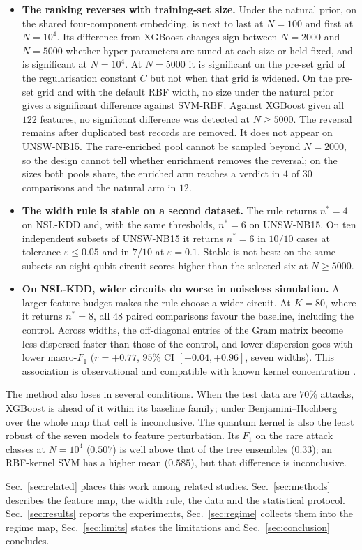 \begin{itemize}
  \item \textbf{The ranking reverses with training-set size.} Under the natural prior, on the
    shared four-component embedding, \QSVM{} is next to last at $N=100$ and first at $N=10^4$.
    Its difference from XGBoost changes sign between $N=2000$ and $N=5000$ whether
    hyper-parameters are tuned at each size or held fixed, and is significant at $N=10^4$.
    At $N=5000$ it is significant on the pre-set grid of the regularisation constant $C$ but
    not when that grid is widened. On the pre-set grid and with the default RBF width, no size
    under the natural prior gives a significant difference against SVM-RBF. Against XGBoost given all $122$ features, no significant difference was
    detected at $N\ge5000$. The reversal remains after duplicated test records are removed. It
    does not appear on UNSW-NB15. The rare-enriched pool cannot be sampled beyond $N=2000$, so
    the design cannot tell whether enrichment removes the reversal; on the sizes both pools
    share, the enriched arm reaches a verdict in $4$ of $30$ comparisons and the natural arm in
    $12$.
  \item \textbf{The width rule is stable on a second dataset.} The rule returns $n^{\ast}=4$ on NSL-KDD and, with the
    same thresholds, $n^{\ast}=6$ on UNSW-NB15. On ten independent subsets of UNSW-NB15 it
    returns $n^{\ast}=6$ in $10/10$ cases at tolerance $\varepsilon\le0.05$ and in $7/10$ at
    $\varepsilon=0.1$. Stable is not best: on the same subsets an eight-qubit circuit scores
    higher than the selected six at $N\ge5000$.
  \item \textbf{On NSL-KDD, wider circuits do worse in noiseless simulation.} A larger feature budget makes
    the rule choose a wider circuit. At $K=80$, where it returns $n^{\ast}=8$, all $48$ paired
    comparisons favour the baseline, including the \Zmap{} control. Across widths, the off-diagonal entries of the
    \ZZ{} Gram matrix become less dispersed faster than those of the control, and lower
    dispersion goes with lower macro-$F_1$ ($r=+0.77$, $95\%$ CI $[+0.04,+0.96]$, seven
    widths). This association is observational and compatible with known kernel
    concentration \cite{thanasilp2024}.
\end{itemize}

The method also loses in several conditions. When the test data are $70\%$ attacks, XGBoost is
ahead of it within its baseline family; under Benjamini--Hochberg over the whole map that cell is
inconclusive. The quantum kernel is also the least robust of the seven models to feature
perturbation. Its $F_1$ on the rare attack classes at $N=10^4$ ($0.507$) is well above
that of the tree ensembles ($0.33$); an RBF-kernel SVM has a higher mean ($0.585$), but that
difference is inconclusive.

Sec.~\ref{sec:related} places this work among related studies. Sec.~\ref{sec:methods} describes
the feature map, the width rule, the data and the statistical protocol. Sec.~\ref{sec:results}
reports the experiments, Sec.~\ref{sec:regime} collects them into the regime map,
Sec.~\ref{sec:limits} states the limitations and Sec.~\ref{sec:conclusion} concludes.
